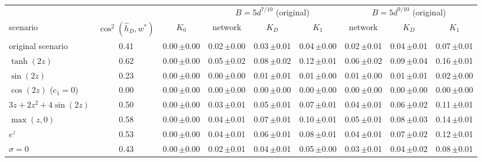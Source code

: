 \begin{tabular}{lcc|ccc|ccc}
\toprule
 & & & \multicolumn{3}{c|}{$B=5d^{7/10}$ (original)} & \multicolumn{3}{c}{$B=5d^{9/10}$ (original)} \\
scenario & $\cos^2(\hat h_D,w^*)$ & $K_0$ & network & $K_D$ & $K_1$ & network & $K_D$ & $K_1$ \\
\midrule
original scenario & 0.41 & 0.00\,{\scriptsize$\pm$0.00} & 0.02\,{\scriptsize$\pm$0.00} & 0.03\,{\scriptsize$\pm$0.01} & 0.04\,{\scriptsize$\pm$0.00} & 0.02\,{\scriptsize$\pm$0.01} & 0.04\,{\scriptsize$\pm$0.01} & 0.07\,{\scriptsize$\pm$0.01} \\
\midrule
$\tanh(2z)$ & 0.62 & 0.00\,{\scriptsize$\pm$0.00} & 0.05\,{\scriptsize$\pm$0.02} & 0.08\,{\scriptsize$\pm$0.02} & 0.12\,{\scriptsize$\pm$0.01} & 0.06\,{\scriptsize$\pm$0.02} & 0.09\,{\scriptsize$\pm$0.04} & 0.16\,{\scriptsize$\pm$0.01} \\
$\sin(2z)$ & 0.23 & 0.00\,{\scriptsize$\pm$0.00} & 0.00\,{\scriptsize$\pm$0.00} & 0.01\,{\scriptsize$\pm$0.01} & 0.01\,{\scriptsize$\pm$0.00} & 0.01\,{\scriptsize$\pm$0.00} & 0.01\,{\scriptsize$\pm$0.01} & 0.02\,{\scriptsize$\pm$0.00} \\
$\cos(2z)$ ($c_1=0$) & 0.00 & 0.00\,{\scriptsize$\pm$0.00} & 0.00\,{\scriptsize$\pm$0.00} & 0.00\,{\scriptsize$\pm$0.00} & 0.00\,{\scriptsize$\pm$0.00} & 0.00\,{\scriptsize$\pm$0.00} & 0.00\,{\scriptsize$\pm$0.00} & 0.00\,{\scriptsize$\pm$0.00} \\
\midrule
$3z+2z^2+4\sin(2z)$ & 0.50 & 0.00\,{\scriptsize$\pm$0.00} & 0.03\,{\scriptsize$\pm$0.01} & 0.05\,{\scriptsize$\pm$0.01} & 0.07\,{\scriptsize$\pm$0.01} & 0.04\,{\scriptsize$\pm$0.01} & 0.06\,{\scriptsize$\pm$0.02} & 0.11\,{\scriptsize$\pm$0.01} \\
$\max(z,0)$ & 0.58 & 0.00\,{\scriptsize$\pm$0.00} & 0.04\,{\scriptsize$\pm$0.01} & 0.07\,{\scriptsize$\pm$0.01} & 0.10\,{\scriptsize$\pm$0.01} & 0.05\,{\scriptsize$\pm$0.01} & 0.08\,{\scriptsize$\pm$0.03} & 0.14\,{\scriptsize$\pm$0.01} \\
$e^{z}$ & 0.53 & 0.00\,{\scriptsize$\pm$0.00} & 0.04\,{\scriptsize$\pm$0.01} & 0.06\,{\scriptsize$\pm$0.01} & 0.08\,{\scriptsize$\pm$0.01} & 0.04\,{\scriptsize$\pm$0.01} & 0.07\,{\scriptsize$\pm$0.02} & 0.12\,{\scriptsize$\pm$0.01} \\
\midrule
$\sigma=0$ & 0.43 & 0.00\,{\scriptsize$\pm$0.00} & 0.02\,{\scriptsize$\pm$0.01} & 0.04\,{\scriptsize$\pm$0.01} & 0.05\,{\scriptsize$\pm$0.00} & 0.03\,{\scriptsize$\pm$0.01} & 0.04\,{\scriptsize$\pm$0.02} & 0.08\,{\scriptsize$\pm$0.01} \\

\end{tabular}
